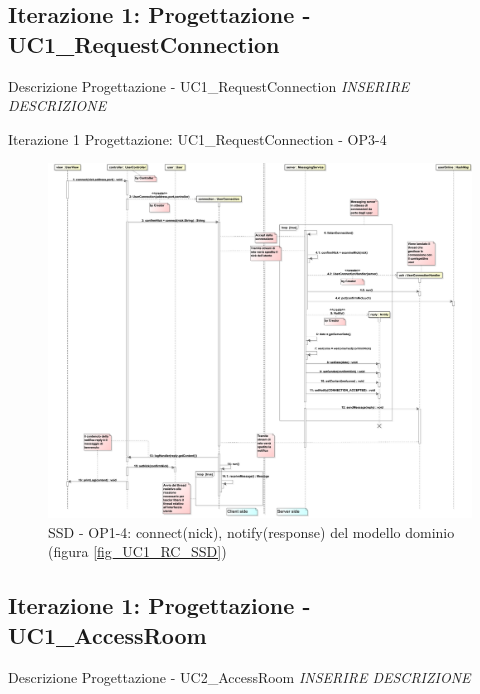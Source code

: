 \documentclass[t]{beamer} %
\begin{document}
\subsection{Iterazione 1: Progettazione - UC1\_RequestConnection}
\begin{frame} {Descrizione Progettazione - UC1\_RequestConnection }
 \emph{INSERIRE DESCRIZIONE}
\end{frame}

\begin{frame} {Iterazione 1 Progettazione: UC1\_RequestConnection - OP3-4}
   \begin{figure}
     \includegraphics[scale=0.069]{image_astah/Iteration_1_DesignModel/UC1_RequestConnection_SSD_3_4_connect.png}{\centering}
     \caption{SSD - OP1-4: connect(nick), notify(response) del modello dominio (figura \ref{fig_UC1_RC_SSD}) }
     \label{fig_UC1_SSD_RC_1_4} 
   \end{figure}
\end{frame}

\subsection{Iterazione 1: Progettazione - UC1\_AccessRoom}
\begin{frame} {Descrizione Progettazione - UC2\_AccessRoom }
 \emph{INSERIRE DESCRIZIONE}
\end{frame}
\end{document}

